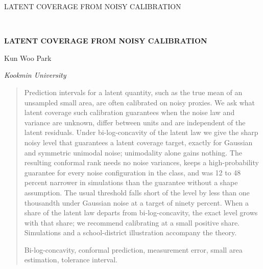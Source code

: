 \documentclass[12pt]{article}
\theoremstyle{definition}
\begin{document}
\renewcommand{\baselinestretch}{2}


{\hfill {\footnotesize\rm LATENT COVERAGE FROM NOISY CALIBRATION} \hfill}

\renewcommand{\thefootnote}{}
$\ $\par

\fontsize{12}{14pt plus.8pt minus .6pt}\selectfont \vspace{0.8pc}
\centerline{\large\bf LATENT COVERAGE FROM NOISY CALIBRATION}
\vspace{.4cm}
\centerline{Kun Woo Park}
\vspace{.4cm}
\centerline{\it Kookmin University}
\vspace{.55cm} \fontsize{9}{11.5pt plus.8pt minus.6pt}\selectfont

\begin{quotation}
Prediction intervals for a latent quantity, such as the true mean of an unsampled small area, are often calibrated on noisy proxies. We ask what latent coverage such calibration guarantees when the noise law and variance are unknown, differ between units and are independent of the latent residuals. Under bi-log-concavity of the latent law we give the sharp noisy level that guarantees a latent coverage target, exactly for Gaussian and symmetric unimodal noise; unimodality alone gains nothing. The resulting conformal rank needs no noise variances, keeps a high-probability guarantee for every noise configuration in the class, and was 12 to 48 percent narrower in simulations than the guarantee without a shape assumption. The usual threshold falls short of the level by less than one thousandth under Gaussian noise at a target of ninety percent. When a share of the latent law departs from bi-log-concavity, the exact level grows with that share; we recommend calibrating at a small positive share. Simulations and a school-district illustration accompany the theory.

\vspace{9pt}
Bi-log-concavity, conformal prediction, measurement error, small area estimation, tolerance interval.
\par
\end{quotation}\par
\end{document}
